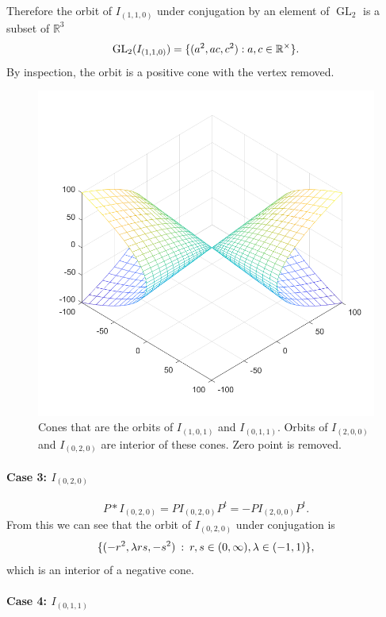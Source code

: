 \documentclass{article}
\theoremstyle{definition}
\newcommand{\R}{\mathbb{R}}
\newcommand{\GL}{\operatorname{GL}}
\DeclarePairedDelimiter\set{\{}{\}}
\begin{document}
Therefore the orbit of $I_{(1,1,0)}$ under conjugation by an element of $\GL_2$ is a subset of $\R^3$
\[
	\GL_2 (I_{(1,1,0)}) = \set{(a^2, ac, c^2): a,c \in \R^\times}.
\]
By inspection, the orbit is a positive cone with the vertex removed. 

\begin{figure}[h]
    \caption{Cones that are the orbits of $I_{(1,0,1)}$ and $I_{(0,1,1)}$. Orbits of $I_{(2,0,0)}$ and $I_{(0,2,0)}$ are interior of these cones. Zero point is removed.}
    \includegraphics[width=0.8 \textwidth]{Both.png}
\end{figure}

\paragraph{Case 3: $I_{(0,2,0)}$}

\[
	P * I_{(0,2,0)} = P I_{(0,2,0)} P^t = - P I_{(2,0,0)} P^t.
\]
From this we can see that the orbit of $I_{(0,2,0)}$ under conjugation is
\[
	\set{(-r^2, \lambda rs, -s^2) \> : \> r,s \in (0, \infty), \lambda \in (-1,1)},
\]
which is an interior of a negative cone. 

\paragraph{Case 4: $I_{(0,1,1)}$}
\end{document}
